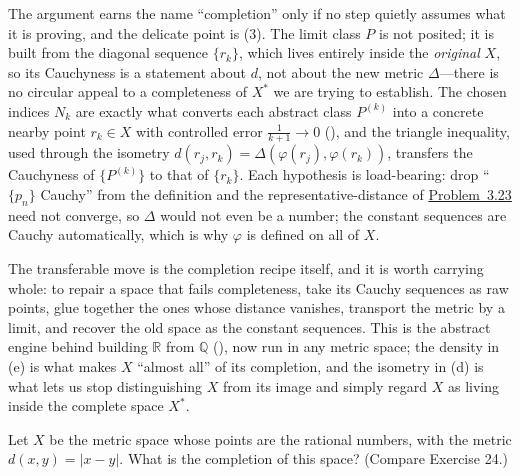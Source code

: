 \documentclass[main.tex]{subfiles}
\begin{document}
\begin{Reflection}
The argument earns the name ``completion'' only if no step quietly assumes what it is proving, and the
delicate point is (3). The limit class $P$ is not posited; it is built from the diagonal sequence
$\{r_k\}$, which lives entirely inside the \emph{original} $X$, so its Cauchyness is a statement about
$d$, not about the new metric $\Delta$---there is no circular appeal to a completeness of $X^*$ we are
trying to establish. The chosen indices $N_k$ are exactly what converts each abstract class $P^{(k)}$
into a concrete nearby point $r_k\in X$ with controlled error $\tfrac1{k+1}\to 0$
(), and the triangle inequality, used through the isometry
$d(r_j,r_k)=\Delta(\varphi(r_j),\varphi(r_k))$, transfers the Cauchyness of $\{P^{(k)}\}$ to that of
$\{r_k\}$. Each hypothesis is load-bearing: drop ``$\{p_n\}$ Cauchy'' from the definition and the
representative-distance of \hyperlink{prob:3.23}{Problem~3.23} need not converge, so $\Delta$ would not
even be a number; the constant sequences are Cauchy automatically, which is why $\varphi$ is defined on
all of $X$.

The transferable move is the completion recipe itself, and it is worth carrying whole: to repair a
space that fails completeness, take its Cauchy sequences as raw points, glue together the ones whose
distance vanishes, transport the metric by a limit, and recover the old space as the constant sequences.
This is the abstract engine behind building $\mathbb R$ from $\mathbb Q$ (), now run in any
metric space; the density in (e) is what makes $X$ ``almost all'' of its completion, and the
isometry in (d) is what lets us stop distinguishing $X$ from its image and simply regard $X$ as living
inside the complete space $X^*$.
\end{Reflection}

Let $X$ be the metric space whose points are the rational numbers, with the metric $d(x, y) = |x - y|$. What is the completion of this space? (Compare Exercise 24.)
\end{document}
